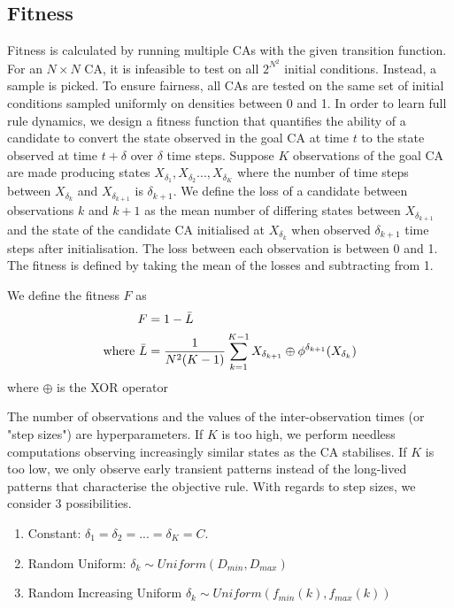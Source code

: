 \subsection{Fitness}

Fitness is calculated by running multiple CAs with the given transition function. For an $N \times N$ CA, it is infeasible to test on all $2^{N^2}$ initial conditions. Instead, a sample is picked. To ensure fairness, all CAs are tested on the same set of initial conditions sampled uniformly on densities between 0 and 1. In order to learn full rule dynamics, we design a fitness function that quantifies the ability of a candidate to convert the state observed in the goal CA at time $t$ to the state observed at time $t+\delta$ over $\delta$ time steps. Suppose $K$ observations of the goal CA are made producing states $X_{\delta_1}, X_{\delta_2} ..., X_{\delta_K}$ where the number of time steps between $X_{\delta_k}$ and $X_{\delta_{k+1}}$ is $\delta_{k+1}$. We define the loss of a candidate between observations $k$ and $k+1$ as the mean number of differing states between $X_{\delta_{k+1}}$ and the state of the candidate CA initialised at $X_{\delta_k}$ when observed $\delta_{k+1}$ time steps after initialisation. The loss between each observation is between 0 and 1. The fitness is defined by taking the mean of the losses and subtracting from 1.

\begin{definition}
We define the fitness $F$ as
\begin{align*}
    F &= 1 - \bar{L}\\
    \textnormal{where\ } \bar{L} &= \frac{1}{N^2(K-1)}\sum_{k=1}^{K-1} X_{\delta_{k+1}} \oplus \phi^{\delta_{k+1}}(X_{\delta_k})
\end{align*}
where $\oplus$ is the XOR operator
\end{definition}

The number of observations and the values of the inter-observation times (or "step sizes") are hyperparameters. If $K$ is too high, we perform needless computations observing increasingly similar states as the CA stabilises. If $K$ is too low, we only observe early transient patterns instead of the long-lived patterns that characterise the objective rule. With regards to step sizes, we consider 3 possibilities.

\begin{enumerate}
    \item Constant: $\delta_1 = \delta_2 = ... = \delta_K = C$.
    \item Random Uniform: $\delta_k \sim \mathit{Uniform}(D_{min}, D_{max})$
    \item Random Increasing Uniform $\delta_k \sim \mathit{Uniform}(f_{min}(k), f_{max}(k))$
\end{enumerate}

